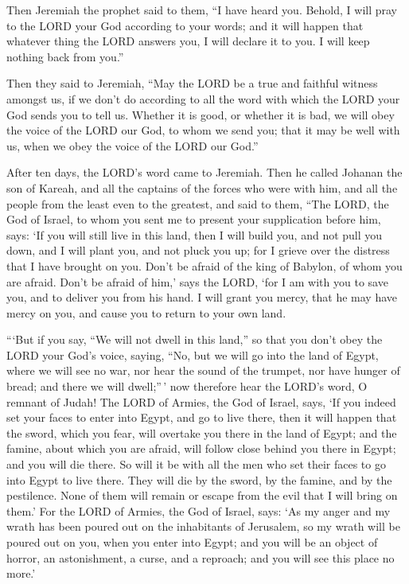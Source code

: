  Then Jeremiah the prophet said to them, ``I have heard you.
Behold, I will pray to the LORD your God according to your words; and it
will happen that whatever thing the LORD answers you, I will declare it
to you. I will keep nothing back from you.''

 Then they said to Jeremiah, ``May the LORD be a true and
faithful witness amongst us, if we don't do according to all the word
with which the LORD your God sends you to tell us.  Whether
it is good, or whether it is bad, we will obey the voice of the LORD our
God, to whom we send you; that it may be well with us, when we obey the
voice of the LORD our God.''

 After ten days, the LORD's word came to Jeremiah.
 Then he called Johanan the son of Kareah, and all the
captains of the forces who were with him, and all the people from the
least even to the greatest,  and said to them, ``The LORD,
the God of Israel, to whom you sent me to present your supplication
before him, says:  `If you will still live in this land,
then I will build you, and not pull you down, and I will plant you, and
not pluck you up; for I grieve over the distress that I have brought on
you.  Don't be afraid of the king of Babylon, of whom you
are afraid. Don't be afraid of him,' says the LORD, `for I am with you
to save you, and to deliver you from his hand.  I will
grant you mercy, that he may have mercy on you, and cause you to return
to your own land.

 ```But if you say, ``We will not dwell in this land,'' so
that you don't obey the LORD your God's voice,  saying,
``No, but we will go into the land of Egypt, where we will see no war,
nor hear the sound of the trumpet, nor have hunger of bread; and there
we will dwell;''\,'  now therefore hear the LORD's word, O
remnant of Judah! The LORD of Armies, the God of Israel, says, `If you
indeed set your faces to enter into Egypt, and go to live there,
 then it will happen that the sword, which you fear, will
overtake you there in the land of Egypt; and the famine, about which you
are afraid, will follow close behind you there in Egypt; and you will
die there.  So will it be with all the men who set their
faces to go into Egypt to live there. They will die by the sword, by the
famine, and by the pestilence. None of them will remain or escape from
the evil that I will bring on them.'  For the LORD of
Armies, the God of Israel, says: `As my anger and my wrath has been
poured out on the inhabitants of Jerusalem, so my wrath will be poured
out on you, when you enter into Egypt; and you will be an object of
horror, an astonishment, a curse, and a reproach; and you will see this
place no more.'

